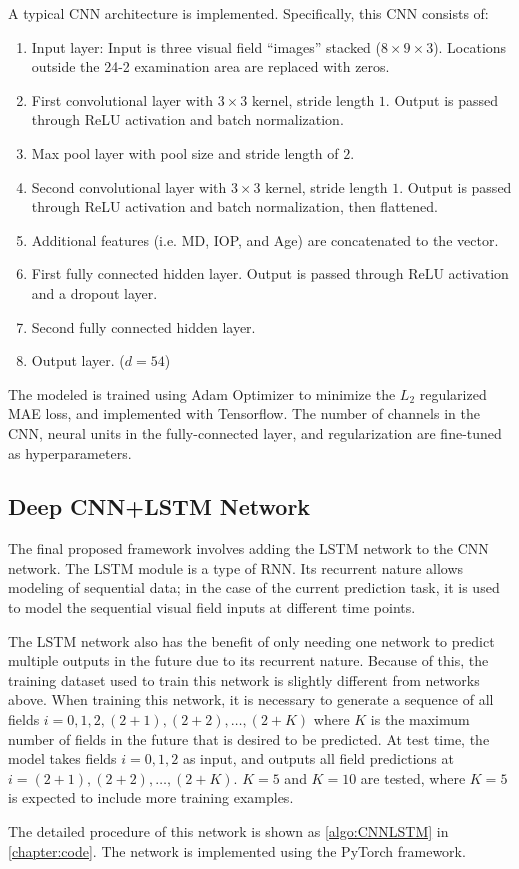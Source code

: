 A typical \ac{CNN} architecture is implemented. Specifically, this \ac{CNN} consists of:

\begin{enumerate}
\item Input layer: Input is three visual field ``images'' stacked ($8\times9\times3$). Locations outside the 24-2 examination area are replaced with zeros. 
\item First convolutional layer with $3\times3$ kernel, stride length $1$. Output is passed through ReLU activation and batch normalization. 
\item Max pool layer with pool size and stride length of $2$. 
\item Second convolutional layer with $3\times3$ kernel, stride length $1$. Output is passed through ReLU activation and batch normalization, then flattened. 
\item Additional features (i.e. MD, IOP, and Age) are concatenated to the vector. 
\item First fully connected hidden layer. Output is passed through ReLU activation and a dropout layer. 
\item Second fully connected hidden layer. 
\item Output layer. ($d=54$)
\end{enumerate}

The modeled is trained using Adam Optimizer to minimize the $L_2$ regularized \ac{MAE} loss, and implemented with Tensorflow. \cite{tensorflow} The number of channels in the \ac{CNN}, neural units in the fully-connected layer, and regularization are fine-tuned as hyperparameters. 

\subsection{Deep CNN+LSTM Network}

The final proposed framework involves adding the \ac{LSTM} network to the \ac{CNN} network. The \ac{LSTM} module is a type of \ac{RNN}. Its recurrent nature allows modeling of sequential data; in the case of the current prediction task, it is used to model the sequential visual field inputs at different time points. 

The \ac{LSTM} network also has the benefit of only needing one network to predict multiple outputs in the future due to its recurrent nature. Because of this, the training dataset used to train this network is slightly different from networks above. When training this network, it is necessary to generate a sequence of all fields $i=0, 1, 2, (2+1), (2+2), \dots, (2+K)$ where $K$ is the maximum number of fields in the future that is desired to be predicted. At test time, the model takes fields $i=0, 1, 2$ as input, and outputs all field predictions at $i=(2+1), (2+2), \dots, (2+K)$. $K=5$ and $K=10$ are tested, where $K=5$ is expected to include more training examples. 

The detailed procedure of this network is shown as \cref{algo:CNNLSTM} in \cref{chapter:code}. The network is implemented using the PyTorch framework. \cite{paszke2017automatic} 


